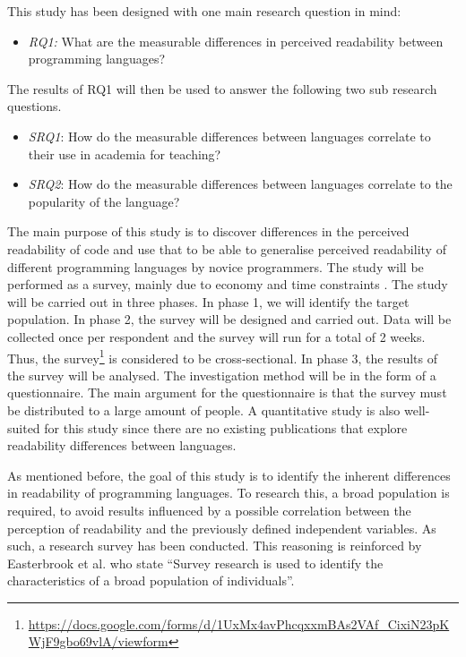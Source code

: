 \documentclass[times, 10pt,twocolumn]{IEEEtran}
\begin{document}
This study has been designed with one main research question in mind:
\begin{itemize}
\item \textit{RQ1:} What are the measurable differences in perceived readability between programming languages?
\end{itemize}


The results of RQ1 will then be used to answer the following two sub research questions. 
\begin{itemize}
\item \textit{SRQ1}: How do the measurable differences between languages correlate to their use in academia for teaching?
\item \textit{SRQ2}: How do the measurable differences between languages correlate to the popularity of the language?
\end{itemize}


The main purpose of this study is to discover differences in the perceived readability of code and use that to be able to generalise perceived readability of different programming languages by novice programmers. The study will be performed as a survey, mainly due to economy and time constraints \cite{fowler2008survey}. The study will be carried out in three phases. In phase 1, we will identify the target population. In phase 2, the survey will be designed and carried out. Data will be collected once per respondent and the survey will run for a total of 2 weeks. Thus, the survey\footnote{\url{https://docs.google.com/forms/d/1UxMx4avPhcqxxmBAs2VAf_CixiN23pKWjF9gbo69vlA/viewform}} is considered to be cross-sectional. In phase 3, the results of the survey will be analysed. The investigation method will be in the form of a questionnaire. The main argument for the questionnaire is that the survey must be distributed to a large amount of people. A quantitative study is also well-suited for this study since there are no existing publications that explore readability differences between languages. 


As mentioned before, the goal of this study is to identify the inherent differences in readability of programming languages. To research this, a broad population is required, to avoid results influenced by a possible correlation between the perception of readability and the previously defined independent variables. As such, a research survey has been conducted. This reasoning is reinforced by Easterbrook et al. \cite{easterbrook2008selecting} who state ``Survey research is used to identify the characteristics of a broad population of individuals''. 
\newline
\end{document}
